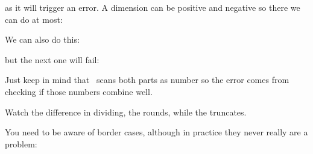 \starttyping[option=TEX]
\stoptyping

as it will trigger an error. A dimension can be positive and negative so there we
can do at most:

\starttyping[option=TEX]
\scratchdimen  1073741823sp
\stoptyping

\startbuffer
{}
\number\scratchdimen
\the\scratchdimen
{}
\number\scratchdimen
\the\scratchdimen
\stopbuffer

\typebuffer[option=TEX]

\startlines
\getbuffer
\stoplines

We can also do this:

\startbuffer
{}
\number\scratchdimen
\the\scratchdimen
\stopbuffer

\typebuffer[option=TEX]

\startlines
\getbuffer
\stoplines

but the next one will fail:

\starttyping[option=TEX]
\stoptyping

Just keep in mind that \TEX\ scans both parts as number so the error comes from
checking if those numbers combine well.

\startbuffer
\ifdim 16383.99999  pt = 16383.99998  pt the same \else different \fi
\ifdim 16383.999979 pt = 16383.999980 pt the same \else different \fi
\ifdim 16383.999987 pt = 16383.999991 pt the same \else different \fi
\stopbuffer

\typebuffer[option=TEX]

Watch the difference in dividing, the \type {/} rounds, while the \type {:}
truncates.

\startlines
\getbuffer
\stoplines

You need to be aware of border cases, although in practice they never really
are a problem:

\startbuffer
\ifdim \dimexpr16383.99997 pt/2\relax = \dimexpr 16383.99998 pt/2\relax
    the same \else different
\fi
\ifdim \dimexpr16383.99997 pt:2\relax = \dimexpr 16383.99998 pt:2\relax
    the same \else different
\fi
\stopbuffer

\typebuffer[option=TEX]

\startlines
\getbuffer
\stoplines

\startbuffer
\ifdim \dimexpr1.99997 pt/2\relax = \dimexpr 1.99998 pt/2\relax
    the same \else different
\fi
\ifdim \dimexpr1.99997 pt:2\relax = \dimexpr 1.99998 pt:2\relax
    the same \else different
\fi
\stopbuffer

